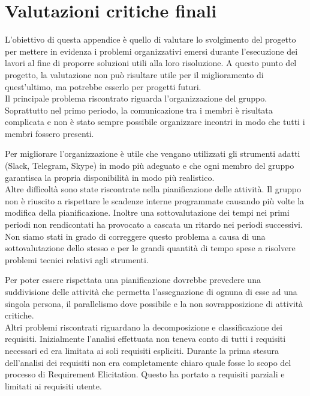 {\begin{center}
\begin{tabular}{|c|c|c|}
		\hline
	\end{tabular}
\end{center}

\section{Valutazioni critiche finali}

L'obiettivo di questa appendice è quello di valutare lo svolgimento del progetto per mettere in evidenza i problemi organizzativi emersi durante l'esecuzione dei lavori al fine di proporre soluzioni utili alla loro risoluzione. A questo punto del progetto, la valutazione non può risultare utile per il miglioramento di quest'ultimo, ma potrebbe esserlo per progetti futuri. \\

Il principale problema riscontrato riguarda l'organizzazione del gruppo. Soprattutto nel primo periodo, la comunicazione tra i membri è risultata complicata e non è stato sempre possibile organizzare incontri in modo che tutti i membri fossero presenti. 

Per migliorare l'organizzazione è utile che vengano utilizzati gli strumenti adatti (Slack, Telegram, Skype) in modo più adeguato e che ogni membro del gruppo garantisca la propria disponibilità in modo più realistico. \\
 
Altre difficoltà sono state riscontrate nella pianificazione delle attività. Il gruppo non è riuscito a rispettare le scadenze interne programmate causando più volte la modifica della pianificazione. 
Inoltre una sottovalutazione dei tempi nei primi periodi non rendicontati ha provocato a cascata un ritardo nei periodi successivi. Non siamo stati in grado di correggere questo problema a causa di una sottovalutazione dello stesso e per le grandi quantità di tempo spese a risolvere problemi tecnici relativi agli strumenti.

Per poter essere rispettata una pianificazione dovrebbe prevedere una suddivisione delle attività che permetta l'assegnazione di ognuna di esse ad una singola persona, il parallelismo dove possibile e la non sovrapposizione di attività critiche.   \\

Altri problemi riscontrati riguardano la decomposizione e classificazione dei requisiti. Inizialmente l'analisi effettuata non teneva conto di tutti i requisiti necessari ed era limitata ai soli requisiti espliciti. Durante la prima stesura dell'analisi dei requisiti non era completamente chiaro quale fosse lo scopo del processo di Requirement Elicitation. Questo ha portato a requisiti parziali e limitati ai requisiti utente. 

}
